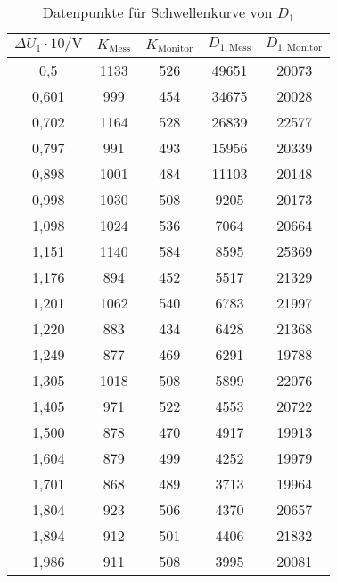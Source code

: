 \begin{table}[h]
    \centering
    \small
    \caption{Datenpunkte für Schwellenkurve von $D_1$}
    \label{tab:schwelle_d1}
    \begin{tabular}{c c c c c}
      \toprule
      $\Delta U_1 \cdot 10/\si{\volt}$ & $K_\mathrm{Mess}$ & $K_\mathrm{Monitor}$ & $D_{1,\mathrm{Mess}}$ & $D_{1,\mathrm{Monitor}}$ \\
      \midrule
      0,5    &         1133  &  526   &  49651 &  20073\\
      0,601  &         999   &  454   &  34675 &  20028\\
      0,702  &         1164  &  528   &  26839 &  22577\\
      0,797  &         991   &  493   &  15956 &  20339\\
      0,898  &         1001  &  484   &  11103 &  20148\\
      0,998  &         1030  &  508   &  9205  &  20173\\
      1,098  &         1024  &  536   &  7064  &  20664\\
      1,151  &	       1140  &	584   &	8595   &  25369\\
      1,176  &		894  &	452   &	5517   &  21329\\
      1,201  &         1062  &  540   &  6783  &  21997\\
      1,220  & 		883  &	434   &	6428   &  21368\\
      1,249  &		877  &	469   &	6291   &  19788\\
      1,305  &         1018  &  508   &  5899  &  22076\\
      1,405  &         971   &  522   &  4553  &  20722\\
      1,500  &         878   &  470   &  4917  &  19913\\
      1,604  &         879   &  499   &  4252  &  19979\\
      1,701  &         868   &  489   &  3713  &  19964\\
      1,804  &         923   &  506   &  4370  &  20657\\
      1,894  &         912   &  501   &  4406  &  21832\\
      1,986  &         911   &  508   &  3995  &  20081\\
      \bottomrule
    \end{tabular}
  \end{table}
